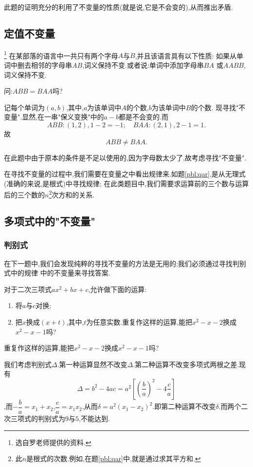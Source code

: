     此题的证明充分的利用了不变量的性质(就是说,它是不会变的),从而推出矛盾.
\subsection{定值不变量}
\begin{problem}\footnote{选自罗老师提供的资料.}
    在某部落的语言中一共只有两个字母$A$与$B$,并且该语言具有以下性质:
    如果从单词中删去相邻的字母串$AB$,词义保持不变.或者说:单词中添加字母串$BA$
    或$AABB$,词义保持不变.
 
    问:$ABB=BAA$吗?
\end{problem}
\begin{solution}
    记每个单词为$(a,b)$,其中,$a$为该单词中$A$的个数,$b$为该单词中$B$的个数.
    现寻找"不变量".显然,在一串"保义变换"中的$a-b$都是不会变的.而$$ABB:(1,2),1-2=-1;\quad BAA:(2,1),2-1=1.$$
    故$$ABB\neq BAA.$$
\end{solution}
在此题中由于原本的条件是不足以使用的,因为字母数太少了,故考虑寻找"不变量".

在寻找不变量的过程中,我们需要在变量之中看出规律来.如题\ref{pbl:qar},是从无理式(准确的来说,是根式)中寻找规律;
在此类题目中,我们需要求运算前的三个数与运算后的三个数的$n$\footnote{此$n$是根式的次数.例如,在题\ref{pbl:qar}中,就是通过求其平方和.}次方和的关系.
\subsection{多项式中的"不变量"}
\subsubsection{判别式}
在下一题中,我们会发现纯粹的寻找不变量的方法是无用的;我们必须通过寻找判别式中的规律
中的不变量来寻找答案.
\begin{problem}
    对于二次三项式$ax^2+bx+c$,允许做下面的运算:
    \begin{enumerate}
        \item 将$a$与$c$对换;
        \item 把$x$换成$(x+t)$,其中,$t$为任意实数.重复作这样的运算,能把$x^2-x-2$换成$x^2-x-1$吗?
    \end{enumerate}
    重复作这样的运算,能把$x^2-x-2$换成$x^2-x-1$吗?
\end{problem}
\begin{solution}
    我们考虑判别式$\Delta$.第一种运算显然不改变$\Delta$.第二种运算不改变多项式两根之差.现有$$\Delta=b^2-4ac=a^2\left[\left(\dfrac{b}{a}\right)^2-4\dfrac{c}{a}\right]$$,而$-\dfrac{b}{a}=x
    _1+x_2$,$\dfrac{c}{a}=x_1x_2$,从而$\delta=a^2\left( x_1-x_2 \right)^2.$即第二种运算不改变$\delta.$而两个二次三项式的判别式为$9$与$5$,不能达到.
\end{solution}
